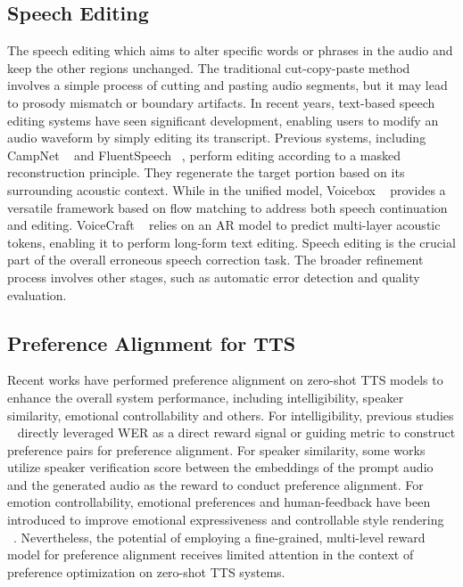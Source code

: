 \documentclass[letterpaper]{article} %
\begin{document}
\subsection{Speech Editing}
The speech editing which aims to alter specific words or phrases in the audio and keep the other regions unchanged. The traditional cut-copy-paste method ~\cite{morrison2021context} involves a simple process of cutting and pasting audio segments, but it may lead to prosody mismatch or boundary artifacts. In recent years, text-based speech editing systems have seen significant development, enabling users to modify an audio waveform by simply editing its transcript. Previous systems, including CampNet ~\cite{wang2022context} and FluentSpeech ~\cite{borsos2022speechpainter}, perform editing according to a masked reconstruction principle. They regenerate the target portion based on its surrounding acoustic context. While in the unified model, Voicebox ~\cite{le2023voicebox} provides a versatile framework based on flow matching to address both speech continuation and editing. VoiceCraft ~\cite{peng2024voicecraft} relies on an AR model to predict multi-layer acoustic tokens, enabling it to perform long-form text editing. Speech editing is the crucial part of the overall erroneous speech correction task. The broader refinement process involves other stages, such as automatic error detection and quality evaluation.

\subsection{Preference Alignment for TTS}
Recent works have performed preference alignment on zero-shot TTS models to enhance the overall system performance, including intelligibility, speaker similarity, emotional controllability and others.
For intelligibility, previous studies ~\cite{zhang2024speechalign,chen2024enhancing} directly leveraged WER as a direct reward signal or guiding metric to construct preference pairs for preference alignment.
For speaker similarity, some works ~\cite{sun2025f5r, hussain2025koel} utilize speaker verification score between the embeddings of the prompt audio and the generated audio as the reward to conduct preference alignment. 
For emotion controllability, emotional preferences and human-feedback have been introduced to improve emotional expressiveness and controllable style rendering ~\cite{gao2025emo, chen2024enhancing}.
Nevertheless, the potential of employing a fine-grained, multi-level reward model for preference alignment receives limited attention in the context of preference optimization on zero-shot TTS systems.
\end{document}
